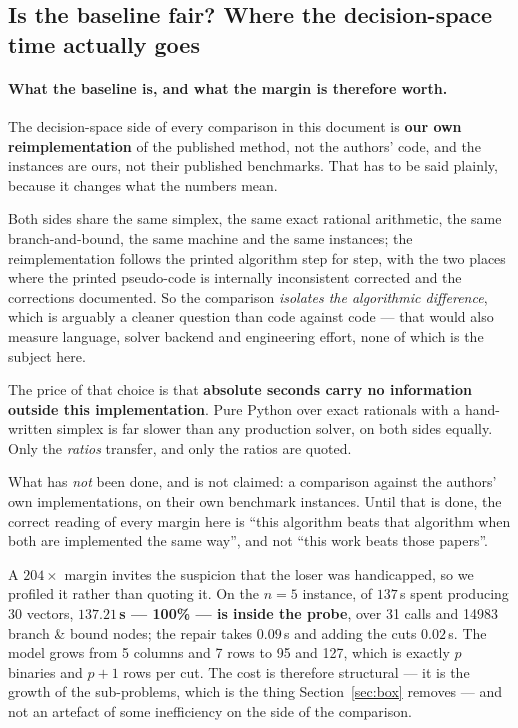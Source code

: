 \documentclass[11pt,a4paper]{article}
\begin{document}
\subsection{Is the baseline fair?  Where the decision-space time actually goes}

\paragraph{What the baseline is, and what the margin is therefore worth.}
The decision-space side of every comparison in this document is \textbf{our own
reimplementation} of the published method, not the authors' code, and the
instances are ours, not their published benchmarks.  That has to be said
plainly, because it changes what the numbers mean.

Both sides share the same simplex, the same exact rational arithmetic, the same
branch-and-bound, the same machine and the same instances; the reimplementation
follows the printed algorithm step for step, with the two places where the
printed pseudo-code is internally inconsistent corrected and the corrections
documented.  So the comparison \emph{isolates the algorithmic difference},
which is arguably a cleaner question than code against code --- that would also
measure language, solver backend and engineering effort, none of which is the
subject here.

The price of that choice is that \textbf{absolute seconds carry no information
outside this implementation}.  Pure Python over exact rationals with a
hand-written simplex is far slower than any production solver, on both sides
equally.  Only the \emph{ratios} transfer, and only the ratios are quoted.

What has \emph{not} been done, and is not claimed: a comparison against the
authors' own implementations, on their own benchmark instances.  Until that is
done, the correct reading of every margin here is ``this algorithm beats that
algorithm when both are implemented the same way'', and not ``this work beats
those papers''.
\label{sec:probe}

A $204\times$ margin invites the suspicion that the loser was handicapped, so
we profiled it rather than quoting it.  On the $n=5$ instance, of $137$\,s
spent producing 30 vectors, \textbf{$137.21$\,s --- 100\% --- is inside the
probe}, over 31 calls and 14983 branch \& bound nodes; the repair takes
$0.09$\,s and adding the cuts $0.02$\,s.  The model grows from 5 columns and 7
rows to 95 and 127, which is exactly $p$ binaries and $p+1$ rows per cut.  The
cost is therefore structural --- it is the growth of the sub-problems, which is
the thing Section~\ref{sec:box} removes --- and not an artefact of some
inefficiency on the side of the comparison.
\end{document}
